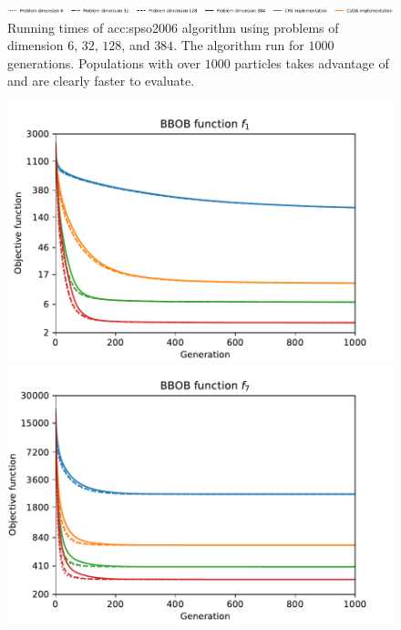 \begin{figure}[ht!]
    \begin{minipage}{\textwidth}
        \centering
        \includegraphics[width=\textwidth]{img/runs/time_pso2006_alldim_legend.pdf}
    \end{minipage}

    \caption[PSO2006 running times]{Running times of \acrlong{acc:spso2006} algorithm using problems of dimension $6$, $32$, $128$, and $384$. The algorithm run for $1000$ generations. Populations with over $1000$ particles takes advantage of \gpu and are clearly faster to evaluate.}
\end{figure}

\begin{figure}[ht!]
    \begin{minipage}[t]{0.32\textwidth}
        \centering
        \includegraphics[width=\textwidth]{img/runs/fitness_pso2006_f1.pdf}
    \end{minipage}
    \hfill
    \begin{minipage}[t]{0.32\textwidth}
        \centering
        \includegraphics[width=\textwidth]{img/runs/fitness_pso2006_f7.pdf}

\end{minipage}
\end{figure}
